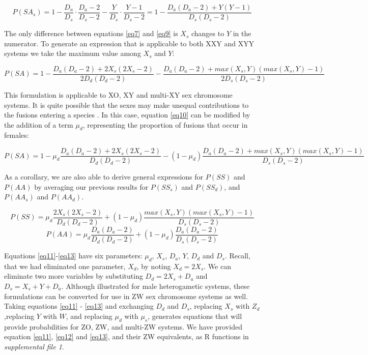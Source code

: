 \documentclass[12pt]{article}
\begin{document}
    \begin{equation} \label{eq9}
        P(SA_s) = 1 - \frac{D_a}{D_s} \cdot \frac{D_a - 2}{D_s - 2} - \frac{Y}{D_s} \cdot \frac{Y - 1}{D_s - 2} = 1 - \frac{D_a(D_a - 2) + Y(Y - 1)}{D_s(D_s - 2)}
    \end{equation}
    
The only difference between equations \ref{eq7} and \ref{eq9} is $X_s$ changes to $Y$ in the numerator. 
To generate an expression that is applicable to both XXY and XYY systems we take the maximum value among $X_s$ and $Y$:

    \begin{equation} \label{eq10}
        P(SA) = 1 -\frac{D_a(D_a-2) + 2X_s(2X_s-2)}{2D_d(D_d-2)} - \frac{D_a(D_a - 2) + max(X_s,Y)(max(X_s,Y)-1)}{2D_s(D_s-2)}
    \end{equation}

This formulation is applicable to XO, XY and multi-XY sex chromosome systems.
It is quite possible that the sexes may make unequal contributions to the fusions entering a species \citep{pennell2015}.
In this case, equation \ref{eq10} can be modified by the addition of a term $\mu_d$, representing the proportion of fusions that occur in females:

\small
    \begin{equation} \label{eq11}
        P(SA) = 1 -\mu_d\frac{D_a(D_a-2) + 2X_s(2X_s-2)}{D_d(D_d-2)} - (1-\mu_d)\frac{D_a(D_a - 2) + max(X_s,Y)(max(X_s,Y)-1)}{D_s(D_s-2)}
    \end{equation}
\normalsize

As a corollary, we are also able to derive general expressions for $P(SS)$ and $P(AA)$ by averaging our previous results for $P(SS_s)$ and $P(SS_d)$, and $P(AA_s)$ and $P(AA_d)$.

\begin{equation} \label{eq12}
    P(SS) = \mu_d\frac{2X_s(2X_s - 2)}{D_d(D_d-2)} + (1-\mu_d)\frac{max(X_s,Y)(max(X_s,Y) - 1)}{D_s(D_s-2)}
\end{equation}
\begin{equation} \label{eq13}
    P(AA) = \mu_d\frac{D_a(D_a-2)}{D_d(D_d-2)} + (1-\mu_d)\frac{D_a(D_a-2)}{D_s(D_s-2)}
\end{equation}

Equations \ref{eq11}-\ref{eq13} have six parameters: $\mu_d$, $X_s$, $D_a$, $Y$, $D_d$ and $D_s$. Recall, that we had eliminated one parameter, $X_d$, by noting $X_d = 2 X_s$. We can eliminate two more variables by substituting $D_d = 2X_s + D_a$ and $D_s = X_s + Y + D_a$.
Although illustrated for male heterogametic systems, these formulations can be converted for use in ZW sex chromosome systems as well.
Taking equations \ref{eq11} - \ref{eq13} and exchanging $D_d$ and $D_s$, replacing $X_s$ with $Z_d$,replacing $Y$ with $W$, and replacing $\mu_d$ with $\mu_s$, generates equations that will provide probabilities for ZO, ZW, and multi-ZW systems.
We have provided equation \ref{eq11}, \ref{eq12} and \ref{eq13}, and their ZW equivalents, as R functions in \textit{supplemental file 1}.
\end{document}
